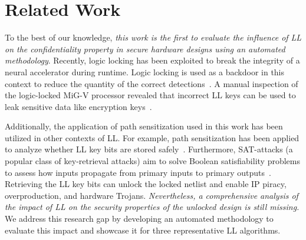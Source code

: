 \section{Related Work}
To the best of our knowledge, \textit{this work is the first to evaluate the influence of LL on the confidentiality property in secure hardware designs using an automated methodology}. Recently, logic locking has been exploited to break the integrity of a neural accelerator during runtime. Logic locking is used as a backdoor in this context to reduce the quantity of the correct detections~\cite{lolo_ai_attack}. A manual inspection of the logic-locked MiG-V processor revealed that incorrect LL keys can be used to leak sensitive data like encryption keys~\cite{mig_v_cracked}.

Additionally, the application of path sensitization used in this work has been utilized in other contexts of LL. For example, path sensitization has been applied to analyze whether LL key bits are stored safely~\cite{path_sensitization_lolo}. %
Furthermore, SAT-attacks (a popular class of key-retrieval attacks) aim to solve Boolean satisfiability problems to assess how inputs propagate from primary inputs to primary outputs~\cite{sat_attack1, sat_attack2, sat_attack3, sat_on_lolo}. Retrieving the LL key bits can unlock the locked netlist and enable IP piracy, overproduction, and hardware Trojans.
\textit{Nevertheless, a comprehensive analysis of the impact of LL on the security properties of the unlocked design is still missing.} We address this research gap by developing an automated methodology to evaluate this impact and showcase it for three representative LL algorithms.